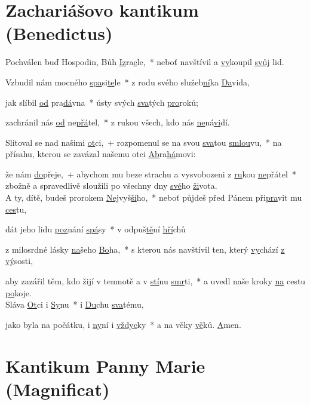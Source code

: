 \documentclass[12pt, a4paper]{article}
\begin{document}
\section*{Zachariášovo kantikum (Benedictus)}

Pochválen buď Hospodin, Bůh \underline{Iz}ra\underline{e}le,~* neboť navštívil a \underline{vy}koupil \underline{svůj} lid. 

Vzbudil nám mocného \underline{spa}si\underline{te}le~* z rodu svého služeb\underline{ní}ka \underline{Da}vida, 

jak slíbil \underline{od} pra\underline{dá}vna~* ústy svých \underline{sva}tých \underline{pro}roků; 

zachránil nás \underline{od} ne\underline{přá}tel,~* z rukou všech, kdo nás \underline{ne}ná\underline{vi}dí. 

Slitoval se nad našimi \underline{ot}ci,~+ rozpomenul se na svou \underline{sva}tou \underline{smlou}vu,~* na přísahu, kterou se zavázal našemu otci \underline{Ab}ra\underline{há}movi: 

že nám \underline{do}přeje,~+ abychom mu beze strachu a vysvobozeni z \underline{ru}kou \underline{ne}přátel~* zbožně a spravedlivě sloužili po všechny dny \underline{své}ho \underline{ži}vota.\\



A ty, dítě, budeš prorokem \underline{Nej}vyš\underline{ší}ho,~* neboť půjdeš před Pánem při\underline{pra}vit mu \underline{ces}tu, 

dát jeho lidu \underline{poz}nání \underline{spá}sy~* v odpuš\underline{tě}ní \underline{hří}chů 

z milosrdné lásky \underline{na}šeho \underline{Bo}ha,~* s kterou nás navštívil ten, který \underline{vy}chází \underline{z vý}sosti, 

aby zazářil těm, kdo žijí v temnotě a v \underline{stí}nu \underline{smr}ti,~* a uvedl naše kroky \underline{na} cestu \underline{po}koje.\\



Sláva \underline{Ot}ci i \underline{Sy}nu~* i \underline{Du}chu \underline{sva}tému, 

jako byla na počátku, i \underline{ny}ní i \underline{vždyc}ky~* a na věky \underline{vě}ků. \underline{A}men.

\pagebreak

\section*{Kantikum Panny Marie (Magnificat)}
\end{document}

